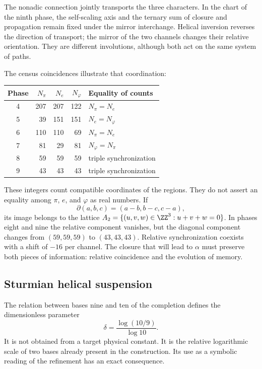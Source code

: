 The nonadic connection jointly transports the three characters. In the chart of the ninth phase, the self-scaling axis and the ternary sum of closure and propagation remain fixed under the mirror interchange. Helical inversion reverses the direction of transport; the mirror of the two channels changes their relative orientation. They are different involutions, although both act on the same system of paths.

The census coincidences illustrate that coordination:
\begin{center}
\begin{tabular}{@{}c rrr l@{}}\toprule
Phase&\(N_\pi\)&\(N_e\)&\(N_\varphi\)&Equality of counts\\\midrule
4&207&207&122&\(N_\pi=N_e\)\\
5&39&151&151&\(N_e=N_\varphi\)\\
6&110&110&69&\(N_\pi=N_e\)\\
7&81&29&81&\(N_\varphi=N_\pi\)\\
8&59&59&59&triple synchronization\\
9&43&43&43&triple synchronization\\\bottomrule
\end{tabular}
\end{center}
These integers count compatible coordinates of the regions. They do not assert an equality among \(\pi\), \(e\), and \(\varphi\) as real numbers. If
\[
 \partial(a,b,c)=(a-b,b-c,c-a),
\]
its image belongs to the lattice \(A_2=\{(u,v,w)\in\ZZ^3:u+v+w=0\}\). In phases eight and nine the relative component vanishes, but the diagonal component changes from \((59,59,59)\) to \((43,43,43)\). Relative synchronization coexists with a shift of \(-16\) per channel. The closure that will lead to \(\alpha\) must preserve both pieces of information: relative coincidence and the evolution of memory.

\subsection{Sturmian helical suspension}

The relation between bases nine and ten of the completion defines the dimensionless parameter
\begin{equation}
 \delta=\frac{\log(10/9)}{\log10}.
 \label{eq:delta-sturm}
\end{equation}
It is not obtained from a target physical constant. It is the relative logarithmic scale of two bases already present in the construction. Its use as a symbolic reading of the refinement has an exact consequence.

